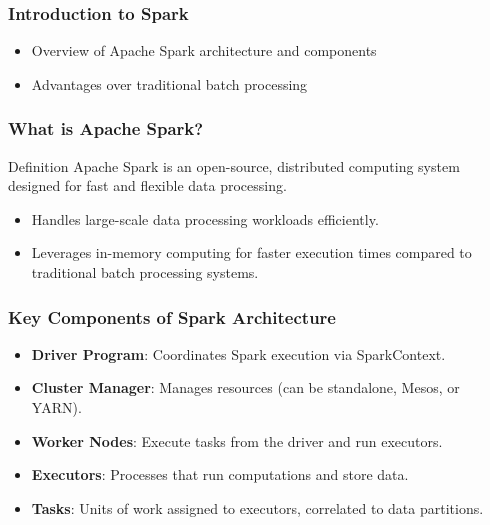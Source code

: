 \documentclass[aspectratio=169]{beamer}
\begin{document}
\begin{frame}
  \frametitle{Introduction to Spark}
  \begin{itemize}
    \item Overview of Apache Spark architecture and components
    \item Advantages over traditional batch processing
  \end{itemize}
\end{frame}

\begin{frame}
  \frametitle{What is Apache Spark?}
  \begin{block}{Definition}
    Apache Spark is an open-source, distributed computing system designed for fast and flexible data processing.
  \end{block}
  \begin{itemize}
    \item Handles large-scale data processing workloads efficiently.
    \item Leverages in-memory computing for faster execution times compared to traditional batch processing systems.
  \end{itemize}
\end{frame}

\begin{frame}
  \frametitle{Key Components of Spark Architecture}
  \begin{itemize}
    \item \textbf{Driver Program}: Coordinates Spark execution via SparkContext.
    \item \textbf{Cluster Manager}: Manages resources (can be standalone, Mesos, or YARN).
    \item \textbf{Worker Nodes}: Execute tasks from the driver and run executors.
    \item \textbf{Executors}: Processes that run computations and store data.
    \item \textbf{Tasks}: Units of work assigned to executors, correlated to data partitions.
  \end{itemize}
\end{frame}
\end{document}
